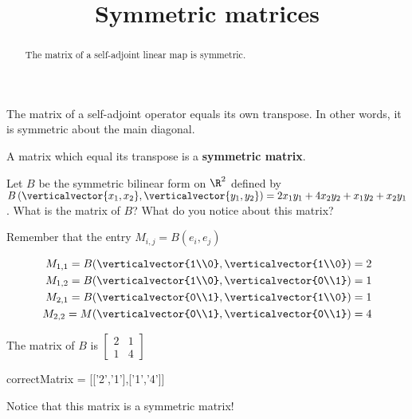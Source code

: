 \documentclass{ximera}
\title{Symmetric matrices}
\begin{document}
\begin{abstract}
  The matrix of a self-adjoint linear map is symmetric.
\end{abstract}

The matrix of a self-adjoint operator equals its own transpose.  In other words, it is symmetric about the main diagonal.  
\begin{definition}
  A matrix which equal its transpose is a \textbf{symmetric matrix}.
\end{definition}

\begin{question}
  Let $B$ be the symmetric bilinear form on $\R^2$ defined by 
  $B\left(\verticalvector{x_1,x_2},\verticalvector{y_1,y_2}\right) = 2x_1y_1+4x_2y_2+x_1y_2+x_2y_1$.  
  What is the matrix of $B$?  What do you notice about this matrix?
  \begin{solution}
    \begin{hint}
      Remember that the entry $M_{i,j} = B(e_i,e_j)$
    \end{hint}
    \begin{hint}
      \begin{align*}
        M_{1,1} = B(\verticalvector{1\\0},\verticalvector{1\\0}) = 2\\
        M_{1,2} = B(\verticalvector{1\\0},\verticalvector{0\\1}) = 1\\
        M_{2,1} = B(\verticalvector{0\\1},\verticalvector{1\\0}) = 1\\
        M_{2,2} = M(\verticalvector{0\\1},\verticalvector{0\\1}) = 4
      \end{align*}
    \end{hint}
    \begin{hint}
      The matrix of $B$ is \(\begin{bmatrix} 2 & 1 \\ 1 & 4\end{bmatrix}\)
    \end{hint}
    \begin{matrix-answer}
      correctMatrix = [['2','1'],['1','4']]
    \end{matrix-answer}
  \end{solution}
  Notice that this matrix is a symmetric matrix!
\end{question}
\end{document}
